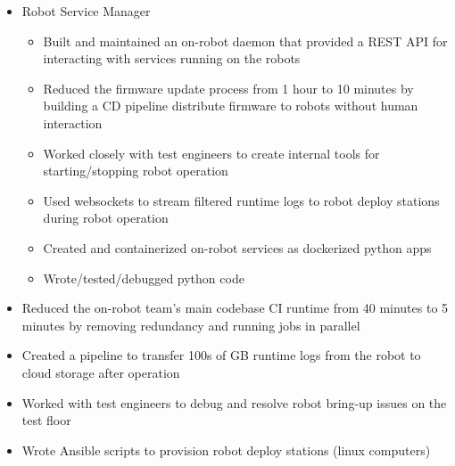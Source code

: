 \documentclass{article}
\begin{document}
\begin{itemize}
    \item Robot Service Manager
	\begin{itemize}
		\item Built and maintained an on-robot daemon that provided a REST API for interacting with services running on the robots

		\item Reduced the firmware update process from 1 hour to 10 minutes by building a CD pipeline distribute firmware to robots without human interaction

		\item Worked closely with test engineers to create internal tools for starting/stopping robot operation

		\item Used websockets to stream filtered runtime logs to robot deploy stations during robot operation

		\item Created and containerized on-robot services as dockerized python apps

		\item Wrote/tested/debugged python code
	\end{itemize}
	\vspace{1mm}

	\item Reduced the on-robot team's main codebase CI runtime from 40 minutes to 5 minutes by removing redundancy and running jobs in parallel

	\item Created a pipeline to transfer 100s of GB runtime logs from the robot to cloud storage after operation

	\item Worked with test engineers to debug and resolve robot bring-up issues on the test floor

	\item Wrote Ansible scripts to provision robot deploy stations (linux computers)



\end{itemize}
\end{document}
